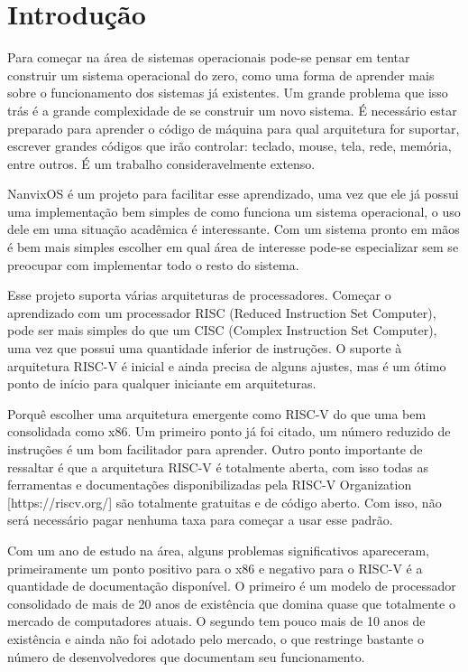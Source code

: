 \section{Introdução}


Para começar na área de sistemas operacionais pode-se pensar em tentar construir um sistema operacional do zero, 
como uma forma de aprender mais sobre o funcionamento dos sistemas já existentes. Um grande problema que isso 
trás é a grande complexidade de se construir um novo sistema. É necessário estar preparado para aprender o 
código de máquina para qual arquitetura for suportar, escrever grandes códigos que irão controlar: teclado, 
mouse, tela, rede, memória, entre outros. É um trabalho consideravelmente extenso.

NanvixOS é um projeto para facilitar esse aprendizado, uma vez que ele já possui uma implementação bem 
simples de como funciona um sistema operacional, o uso dele em uma situação acadêmica é interessante. Com 
um sistema pronto em mãos é bem mais simples escolher em qual área de interesse pode-se especializar sem se 
preocupar com implementar todo o resto do sistema.

Esse projeto suporta várias arquiteturas de processadores. Começar o aprendizado com um processador RISC 
(Reduced Instruction Set Computer), pode ser mais simples do que um CISC (Complex Instruction Set Computer), 
uma vez que possui uma quantidade inferior de instruções. O suporte à arquitetura RISC-V é inicial e ainda 
precisa de alguns ajustes, mas é um ótimo ponto de início para qualquer iniciante em arquiteturas.

Porquê escolher uma arquitetura emergente como RISC-V do que uma bem consolidada como x86. Um primeiro ponto 
já foi citado, um número reduzido de instruções é um bom facilitador para aprender. Outro ponto importante 
de ressaltar é que a arquitetura RISC-V é totalmente aberta, com isso todas as ferramentas e documentações 
disponibilizadas pela RISC-V Organization [https://riscv.org/] são totalmente gratuitas e de código aberto. 
Com isso, não será necessário pagar nenhuma taxa para começar a usar esse padrão.

Com um ano de estudo na área, alguns problemas significativos apareceram, primeiramente um ponto positivo 
para o x86 e negativo para o RISC-V é a quantidade de documentação disponível. O primeiro é um modelo de 
processador consolidado de mais de 20 anos de existência que domina quase que totalmente o mercado de 
computadores atuais. O segundo tem pouco mais de 10 anos de existência e ainda não foi adotado pelo 
mercado, o que restringe bastante o número de desenvolvedores que documentam seu funcionamento.

